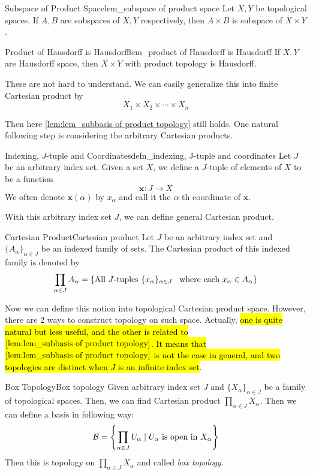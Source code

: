\documentclass[12pt, a4paper, twoside]{article}
\theoremstyle{plain}
\begin{document}
\begin{lem}{Subspace of Product Space}{lem_subspace of product space}
    Let $X, Y$ be topological spaces. If $A, B$ are subspaces of $X, Y$ respectively, then 
    $A \times B$ is subspace of $X \times Y$. 
\end{lem}

\begin{lem}{Product of Hausdorff is Hausdorff}{lem_product of Hausdorff is Hausdorff}
    If $X, Y$ are Hausdorff space, then $X \times Y$ with product topology is Hausdorff. 
\end{lem}

These are not hard to understand. We can easily generalize this into finite Cartesian product by 
\[X_1 \times X_2 \times \cdots \times X_n\]

Then here \ref{lem:lem_subbasis of product topology} still holds. One natural following step is considering the arbitrary 
Cartesian products. 

\begin{defn}{Indexing, $J$-tuple and Coordinates}{defn_indexing, J-tuple and coordinates}
    Let $J$ be an arbitrary index set. Given a set $X$, we define a $J$-tuple of elements of $X$ to be a function 
    \[\mathbf{x}: J \rightarrow X\]
    We often denote $\mathbf{x}(\alpha)$ by $x_\alpha$ and call it the $\alpha$-th coordinate of $\mathbf{x}$. 
\end{defn}

With this arbitrary index set $J$, we can define general Cartesian product. 

\begin{defn}{Cartesian Product}{Cartesian product}
    Let $J$ be an arbitrary index set and $\{A_\alpha\}_{\alpha \in J}$ be an indexed family of sets.
    The Cartesian product of this indexed family is denoted by 
    \[\prod_{\alpha \in J}A_\alpha = \{\text{All $J$-tuples $\{x_\alpha\}_{\alpha \in J}$ \, where each $x_\alpha \in A_\alpha$}\}\]
\end{defn}

Now we can define this notion into topological Cartesian product space. However, there are 2 ways to construct topology on such space. 
Actually, \hl{one is quite natural but less useful, and the other is related to $\ref{lem:lem_subbasis of product topology}$. It means that $\ref{lem:lem_subbasis of product topology}$ is not the case in general, 
and two topologies are distinct when $J$ is an infinite index set}. 

\begin{defn}{Box Topology}{Box topology}
    Given arbitrary index set $J$ and $\{X_\alpha\}_{\alpha \in J}$ be a family of topological spaces. 
    Then, we can find Cartesian product $\prod_{\alpha \in J}X_\alpha$. Then we can define a basis in following way: 
    \[{\mathcal {B}} = \left\{\prod_{\alpha \in J} U_\alpha \mid U_\alpha \text{ is open in $X_\alpha$}\right\}\]
    Then this is topology on $\prod_{\alpha \in J} X_\alpha$ and called \textit{box topology}. 
\end{defn}
\end{document}
